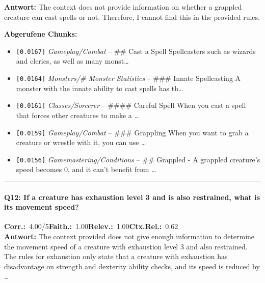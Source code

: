 \noindent\textbf{Antwort:} The context does not provide information on whether a grappled creature can cast spells or not. Therefore, I cannot find this in the provided rules.

\noindent\textbf{Abgerufene Chunks:}
\begin{itemize}[noitemsep, topsep=2pt]
  \item[\textbf{\#1}] \texttt{[0.0167]} \textit{Gameplay/Combat} -- \#\# Cast a Spell  Spellcasters such as wizards and clerics, as well as many monst\ldots
  \item[\textbf{\#2}] \texttt{[0.0164]} \textit{Monsters/# Monster Statistics} -- \#\#\# Innate Spellcasting  A monster with the innate ability to cast spells has th\ldots
  \item[\textbf{\#3}] \texttt{[0.0161]} \textit{Classes/Sorcerer} -- \#\#\#\# Careful Spell  When you cast a spell that forces other creatures to make a \ldots
  \item[\textbf{\#4}] \texttt{[0.0159]} \textit{Gameplay/Combat} -- \#\#\# Grappling  When you want to grab a creature or wrestle with it, you can use \ldots
  \item[\textbf{\#5}] \texttt{[0.0156]} \textit{Gamemastering/Conditions} -- \#\# Grappled  - A grappled creature's speed becomes 0, and it can't benefit from \ldots
\end{itemize}
\vspace{4pt}
\hrule
\vspace{6pt}

\paragraph{Q12: If a creature has exhaustion level 3 and is also restrained, what is its movement speed?}
\noindent \textbf{Corr.:}~4.00/5\quad \textbf{Faith.:}~1.00\quad \textbf{Relev.:}~1.00\quad \textbf{Ctx.Rel.:}~0.62\\

\noindent\textbf{Antwort:} The context provided does not give enough information to determine the movement speed of a creature with exhaustion level 3 and also restrained. The rules for exhaustion only state that a creature with exhaustion has disadvantage on strength and dexterity ability checks, and its speed is reduced by \ldots

